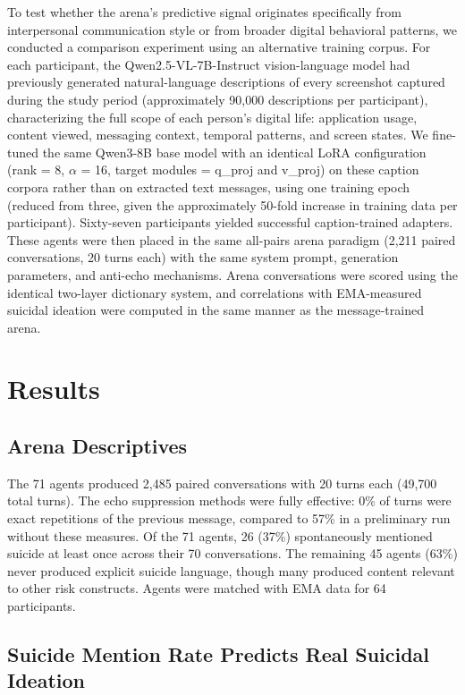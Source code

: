\documentclass[review,12pt,authoryear]{elsarticle}
\begin{document}
To test whether the arena's predictive signal originates specifically from interpersonal communication style or from broader digital behavioral patterns, we conducted a comparison experiment using an alternative training corpus. For each participant, the Qwen2.5-VL-7B-Instruct vision-language model had previously generated natural-language descriptions of every screenshot captured during the study period (approximately 90,000 descriptions per participant), characterizing the full scope of each person's digital life: application usage, content viewed, messaging context, temporal patterns, and screen states. We fine-tuned the same Qwen3-8B base model with an identical LoRA configuration (rank = 8, $\alpha$ = 16, target modules = q\_proj and v\_proj) on these caption corpora rather than on extracted text messages, using one training epoch (reduced from three, given the approximately 50-fold increase in training data per participant). Sixty-seven participants yielded successful caption-trained adapters. These agents were then placed in the same all-pairs arena paradigm (2,211 paired conversations, 20 turns each) with the same system prompt, generation parameters, and anti-echo mechanisms. Arena conversations were scored using the identical two-layer dictionary system, and correlations with EMA-measured suicidal ideation were computed in the same manner as the message-trained arena.


\section{Results}

\subsection{Arena Descriptives}

The 71 agents produced 2,485 paired conversations with 20 turns each (49,700 total turns). The echo suppression methods were fully effective: 0\% of turns were exact repetitions of the previous message, compared to 57\% in a preliminary run without these measures. Of the 71 agents, 26 (37\%) spontaneously mentioned suicide at least once across their 70 conversations. The remaining 45 agents (63\%) never produced explicit suicide language, though many produced content relevant to other risk constructs. Agents were matched with EMA data for 64 participants.

\subsection{Suicide Mention Rate Predicts Real Suicidal Ideation}
\end{document}
